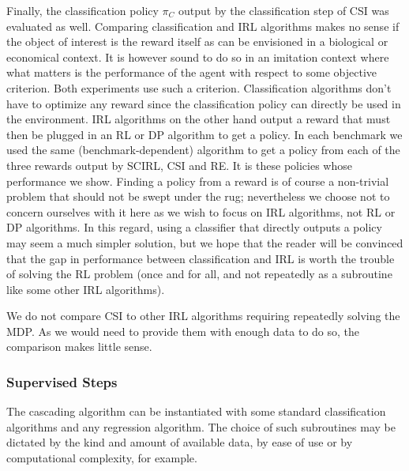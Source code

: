 \documentclass{llncs}
\begin{document}
Finally, the classification policy $\pi_C$ output by the classification step of CSI was evaluated as well. Comparing classification and IRL algorithms makes no sense if the object of interest is the reward itself as can be envisioned in a biological or economical context. It is however sound to do so in an imitation context where what matters is the performance of the agent with respect to some objective criterion. Both experiments use such a criterion. Classification algorithms don't have to optimize any reward since the classification policy can directly be used in the environment. IRL algorithms on the other hand output a reward that must then be plugged in an RL or DP algorithm to get a policy. In each benchmark we used the same (benchmark-dependent) algorithm to get a policy from each of the three rewards output by SCIRL, CSI and RE. It is these policies whose performance we show. Finding a policy from a reward is of course a non-trivial problem that should not be swept under the rug; nevertheless we choose not to concern ourselves with it here as we wish to focus on IRL algorithms, not RL or DP algorithms. In this regard, using a classifier that directly outputs a policy may seem a much simpler solution, but we hope that the reader will be convinced that the gap in performance between classification and IRL is worth the trouble of solving the RL problem (once and for all, and not repeatedly as a subroutine like some other IRL algorithms).

We do not compare CSI to other IRL algorithms requiring repeatedly solving the MDP. As we would need to provide them with enough data to do so, the comparison makes little sense.
\subsubsection{Supervised Steps}
\label{subsubsec:subroutines}
The cascading algorithm can be instantiated with some standard classification algorithms and any regression algorithm. The choice of such subroutines may be dictated by the kind and amount of available data, by ease of use or by computational complexity, for example.
\end{document}

